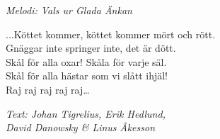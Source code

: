 {\footnotesize\textit{Melodi: Vals ur Glada Änkan}}\par
\vspace{10pt}
...Köttet kommer, köttet kommer mört och rött.\\
Gnäggar inte springer inte, det är dött.\\
Skål för alla oxar! Skåla för varje säl.\\
Skål för alla hästar som vi slått ihjäl!\\
Raj raj raj raj raj…\par
\vspace{10pt}
{\footnotesize\textit{Text: Johan Tigrelius, Erik Hedlund,\\ David Danowsky \& Linus Åkesson}}
